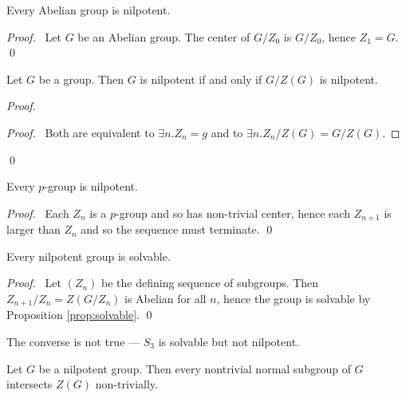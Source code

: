 \begin{prop}
Every Abelian group is nilpotent.
\end{prop}

\begin{proof}
\pf\ Let $G$ be an Abelian group. The center of $G/Z_0$ is $G/Z_0$, hence $Z_1 = G$. \qed
\end{proof}

\begin{prop}
\label{prop:G-over-ZG-nilpotent}
Let $G$ be a group. Then $G$ is nilpotent if and only if $G/Z(G)$ is nilpotent.
\end{prop}

\begin{proof}
\pf
{}
\begin{proof}
	\pf\ Both are equivalent to $\exists n. Z_n = g$ and to $\exists n. Z_n/Z(G) = G/Z(G)$.
\end{proof}
\qed
\end{proof}

\begin{prop}
\label{prop:p-group-nilpotent}
Every $p$-group is nilpotent.
\end{prop}

\begin{proof}
\pf\ Each $Z_n$ is a $p$-group and so has non-trivial center, hence each $Z_{n+1}$ is larger than $Z_n$ and so the sequence must terminate. \qed
\end{proof}

\begin{prop}
Every nilpotent group is solvable.
\end{prop}

\begin{proof}
\pf\ Let $(Z_n)$ be the defining sequence of subgroups. Then $Z_{n+1}/Z_n = Z(G/Z_n)$ is Abelian for all $n$, hence the group is solvable by Proposition \ref{prop:solvable}. \qed
\end{proof}

\begin{ex}
The converse is not true --- $S_3$ is solvable but not nilpotent.
\end{ex}

\begin{prop}
Let $G$ be a nilpotent group. Then every nontrivial normal subgroup of $G$ intersects $Z(G)$ non-trivially.
\end{prop}

